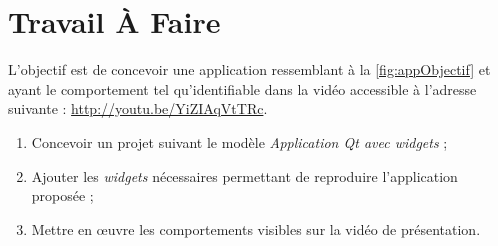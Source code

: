 \documentclass[12pt,a4paper,oneside,titlepage,final]{article}
\begin{document}


\section{Travail À Faire}
L'objectif est de concevoir une application ressemblant à la
\figurename \vref{fig:appObjectif} et ayant le comportement tel
qu'identifiable dans la vidéo accessible à l'adresse suivante :
\url{http://youtu.be/YiZIAqVtTRc}.
\begin{enumerate}
    \item Concevoir un projet suivant le modèle \emph{Application
      \gls{Qt} avec widgets} ;
    \item Ajouter les \emph{widgets} nécessaires permettant de
    reproduire l'application proposée ;
    \item Mettre en œuvre les comportements visibles sur la vidéo de
    présentation.
\end{enumerate}


\newpage \printbibheading
\printbibliography[nottype=online,check=notonline,heading=subbibliography,title={Bibliographiques}]
\printbibliography[check=online,heading=subbibliography,title={Webographiques}]

\printglossaries
\end{document}
